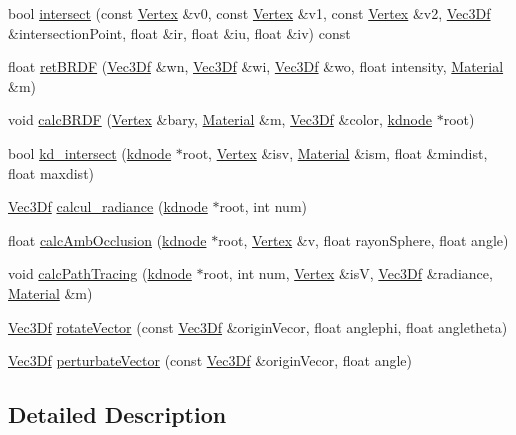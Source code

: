 \begin{DoxyCompactItemize}
\item 
bool \hyperlink{class_ray_ad58816dc53730f35e03b8b738085e586}{intersect} (const \hyperlink{class_vertex}{Vertex} \&v0, const \hyperlink{class_vertex}{Vertex} \&v1, const \hyperlink{class_vertex}{Vertex} \&v2, \hyperlink{class_vec3_d}{Vec3Df} \&intersectionPoint, float \&ir, float \&iu, float \&iv) const 
\item 
float \hyperlink{class_ray_a4c7c49a9863d8a92a231f4564ada7eed}{retBRDF} (\hyperlink{class_vec3_d}{Vec3Df} \&wn, \hyperlink{class_vec3_d}{Vec3Df} \&wi, \hyperlink{class_vec3_d}{Vec3Df} \&wo, float intensity, \hyperlink{class_material}{Material} \&m)
\item 
void \hyperlink{class_ray_a08e5a153b888c634ffcf6ba48fcaa5d9}{calcBRDF} (\hyperlink{class_vertex}{Vertex} \&bary, \hyperlink{class_material}{Material} \&m, \hyperlink{class_vec3_d}{Vec3Df} \&color, \hyperlink{classkdnode}{kdnode} $\ast$root)
\item 
bool \hyperlink{class_ray_ad14dce7566be2b6eee57f4785fcb06c1}{kd\_\-intersect} (\hyperlink{classkdnode}{kdnode} $\ast$root, \hyperlink{class_vertex}{Vertex} \&isv, \hyperlink{class_material}{Material} \&ism, float \&mindist, float maxdist)
\item 
\hyperlink{class_vec3_d}{Vec3Df} \hyperlink{class_ray_a62c0f1bccd99236e718ff3b5d1dc755d}{calcul\_\-radiance} (\hyperlink{classkdnode}{kdnode} $\ast$root, int num)
\item 
float \hyperlink{class_ray_abbe70b4fc986cbc7fb0973dc782b3e5f}{calcAmbOcclusion} (\hyperlink{classkdnode}{kdnode} $\ast$root, \hyperlink{class_vertex}{Vertex} \&v, float rayonSphere, float angle)
\item 
void \hyperlink{class_ray_a6404a6b60943eb40eb9c9abb148ab845}{calcPathTracing} (\hyperlink{classkdnode}{kdnode} $\ast$root, int num, \hyperlink{class_vertex}{Vertex} \&isV, \hyperlink{class_vec3_d}{Vec3Df} \&radiance, \hyperlink{class_material}{Material} \&m)
\item 
\hyperlink{class_vec3_d}{Vec3Df} \hyperlink{class_ray_abd42f2dc0700c906987a6ca4aa99435b}{rotateVector} (const \hyperlink{class_vec3_d}{Vec3Df} \&originVecor, float anglephi, float angletheta)
\item 
\hyperlink{class_vec3_d}{Vec3Df} \hyperlink{class_ray_a08998f4ef12dfd36ca82653a2c438f04}{perturbateVector} (const \hyperlink{class_vec3_d}{Vec3Df} \&originVecor, float angle)
\end{DoxyCompactItemize}


\subsection{Detailed Description}


